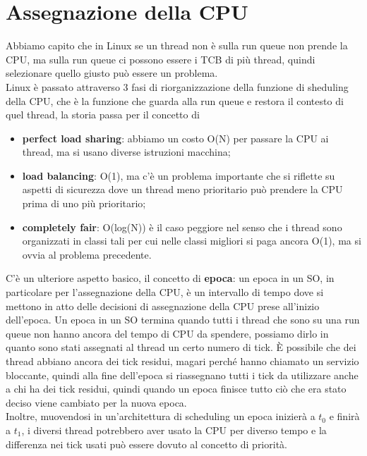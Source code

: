 \documentclass[12pt, oneside]{extbook}
\begin{document}
\section{Assegnazione della CPU}
Abbiamo capito che in Linux se un thread non è sulla run queue non prende la CPU, ma sulla run queue ci possono essere i TCB di più thread, quindi selezionare quello giusto può essere un problema.\\Linux è passato attraverso 3 fasi di riorganizzazione della funzione di sheduling della CPU, che è la funzione che guarda alla run queue e restora il contesto di quel thread, la storia passa per il concetto di
\begin{itemize}
\item \textbf{perfect load sharing}: abbiamo un costo O(N) per passare la CPU ai thread, ma si usano diverse istruzioni macchina;
\item \textbf{load balancing}: O(1), ma c'è un problema importante che si riflette su aspetti di sicurezza dove un thread meno prioritario può prendere la CPU prima di uno più prioritario;
\item \textbf{completely fair}: O(log(N)) è il caso peggiore nel senso che i thread sono organizzati in classi tali per cui nelle classi migliori si paga ancora O(1), ma si ovvia al problema precedente.
\end{itemize}
C'è un ulteriore aspetto basico, il concetto di \textbf{epoca}: un epoca in un SO, in particolare per l'assegnazione della CPU, è un intervallo di tempo dove si mettono in atto delle decisioni di assegnazione della CPU prese all'inizio dell'epoca. Un epoca in un SO termina quando tutti i thread che sono su una run queue non hanno ancora del tempo di CPU da spendere, possiamo dirlo in quanto sono stati assegnati al thread un certo numero di tick. È possibile che dei thread abbiano ancora dei tick residui, magari perché hanno chiamato un servizio bloccante, quindi alla fine dell'epoca si riassegnano tutti i tick da utilizzare anche a chi ha dei tick residui, quindi quando un epoca finisce tutto ciò che era stato deciso viene cambiato per la nuova epoca.\\Inoltre, muovendosi in un'architettura di scheduling un epoca inizierà a $t_0$ e finirà a $t_1$, i diversi thread potrebbero aver usato la CPU per diverso tempo e la differenza nei tick usati può essere dovuto al concetto di priorità.
\end{document}
